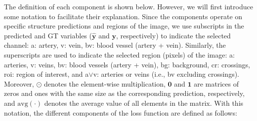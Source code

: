 \documentclass{article}
\begin{document}
The definition of each component is shown below.
However, we will first introduce some notation to facilitate their explanation.
Since the components operate on specific structure predictions and regions of the image, we use subscripts in the predicted and \gls{GT} variables ($\hat{\textbf{y}}$ and $\textbf{y}$, respectively) to indicate the selected channel: a: artery, v: vein, bv: blood vessel (artery + vein).
Similarly, the superscripts are used to indicate the selected region (pixels) of the image: a: arteries, v: veins, bv: blood vessels (artery + vein), bg: background, cr: crossings, roi: region of interest, and a$\vee$v: arteries or veins (i.e., bv excluding crossings).
Moreover, $\odot$ denotes the element-wise multiplication, $\mathbf{0}$ and $\mathbf{1}$ are matrices of zeros and ones with the same size as the corresponding prediction, respectively, and $\text{avg}(\cdot)$ denotes the average value of all elements in the matrix.
With this notation, the different components of the loss function are defined as follows:
\end{document}
